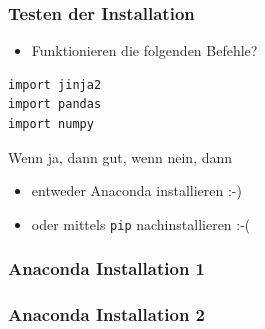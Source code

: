 \documentclass[12pt,ngerman]{beamer}
\begin{document}
\begin{frame}[containsverbatim]
\frametitle{Testen der Installation}

\begin{itemize}
	\item Funktionieren die folgenden Befehle?
\end{itemize}

\begin{lstlisting}
import jinja2
import pandas
import numpy
\end{lstlisting}

Wenn ja, dann gut, wenn nein, dann 

\begin{itemize}
	\item entweder Anaconda installieren :-)
	\item oder mittels \texttt{pip} nachinstallieren :-(
\end{itemize}

\end{frame}

\begin{frame}
\frametitle{Anaconda Installation 1}

\begin{center}
\end{center}

\end{frame}

\begin{frame}
\frametitle{Anaconda Installation 2}

\begin{center}
\end{center}

\end{frame}
\end{document}
